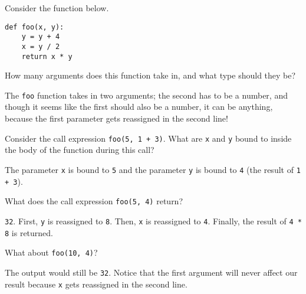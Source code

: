 \question Consider the function below.

\begin{lstlisting}
def foo(x, y):
    y = y + 4
    x = y / 2
    return x * y
\end{lstlisting}

How many arguments does this function take in, and what type should they be?

\begin{solution}[.3in]
The \texttt{foo} function takes in two arguments; the second has to be a
number, and though it seems like the first should also be a number, it can be
anything, because the first parameter gets reassigned in the second line!
\end{solution}

Consider the call expression \texttt{foo(5, 1 + 3)}. What are \texttt{x} and
\texttt{y} bound to inside the body of the function during this call?

\begin{solution}[.3in]
The parameter \texttt{x} is bound to \texttt{5} and the parameter \texttt{y} is
bound to \texttt{4} (the result of \texttt{1 + 3}).
\end{solution}

What does the call expression \texttt{foo(5, 4)} return?

\begin{solution}[.3in]
\texttt{32}. First, \texttt{y} is reassigned to \texttt{8}. Then, \texttt{x} is
reassigned to \texttt{4}. Finally, the result of \texttt{4 * 8} is returned.
\end{solution}

What about \texttt{foo(10, 4)}?

\begin{solution}[.5in]
The output would still be \texttt{32}. Notice that the first argument will
never affect our result because \texttt{x} gets reassigned in the second line.
\end{solution}

